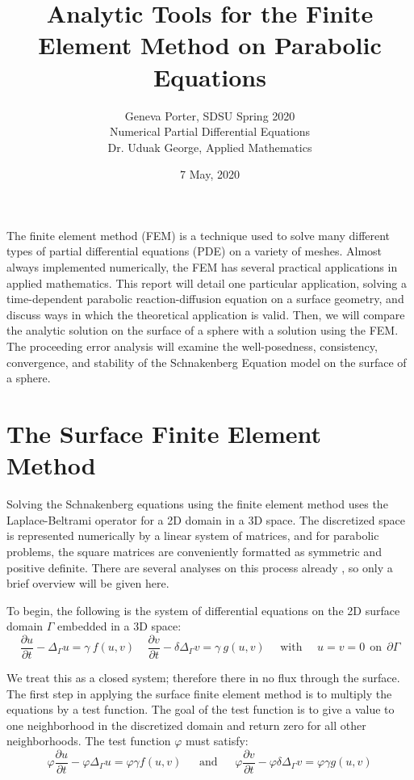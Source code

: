 \documentclass[12pt]{article}
\title{Analytic Tools for the Finite Element Method on Parabolic Equations}
\author{Geneva Porter, SDSU Spring 2020\\ 
Numerical Partial Differential Equations\\
Dr. Uduak George, Applied Mathematics}
\date{7 May, 2020}
\begin{document}
\maketitle

The finite element method (FEM) is a technique used to solve many different types of partial differential equations (PDE) on a variety of meshes. Almost always implemented numerically, the FEM has several practical applications in applied mathematics. This report will detail one particular application, solving a time-dependent parabolic reaction-diffusion equation on a surface geometry, and discuss ways in which the theoretical application is valid. Then, we will compare the analytic solution on the surface of a sphere with a solution using the FEM. The proceeding error analysis will examine the well-posedness, consistency, convergence, and stability of the Schnakenberg Equation model on the surface of a sphere. 

\section{The Surface Finite Element Method}\label{sec:SFEM}

Solving the Schnakenberg equations using the finite element method uses the Laplace-Beltrami operator for a 2D domain in a 3D space. The discretized space is represented numerically by a linear system of matrices, and for parabolic problems, the square matrices are conveniently formatted as symmetric and positive definite. There are several analyses on this process already \cite{Dziuk1988} \cite{Dziuk2013}, so only a brief overview will be given here. 

To begin, the following is the system of differential equations on the 2D surface domain $\Gamma$ embedded in a 3D space:
\begin{equation}
\frac{\partial u}{\partial t} - \Delta_\Gamma u = \gamma~f(u,v) ~~~~~
\frac{\partial v}{\partial t} - \delta\Delta_\Gamma v = \gamma~g(u,v) ~~~~~~ \text{with} ~~~~~~ u = v = 0 ~~ \text{on} ~~ \partial\Gamma
\end{equation}

We treat this as a closed system; therefore there in no flux through the surface. The first step in applying the surface finite element method is to multiply the equations by a test function. The goal of the test function is to give a value to one neighborhood in the discretized domain and return zero for all other neighborhoods. The test function $\varphi$ must satisfy:
\begin{equation}
\varphi\frac{\partial u}{\partial t} - \varphi\Delta_\Gamma u = \varphi\gamma f(u,v) ~~~~~~~ \text{and} ~~~~~~~
\varphi\frac{\partial v}{\partial t} - \varphi\delta\Delta_\Gamma v = \varphi\gamma g(u,v)
\end{equation}
\end{document}
